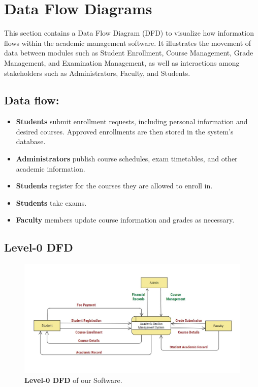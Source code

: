 \documentclass[12pt,a4paper]{article}
\begin{document}
\section{Data Flow Diagrams}
This section contains a Data Flow Diagram (DFD) to visualize how information flows within the academic management software. It illustrates the movement of data between modules such as Student Enrollment, Course Management, Grade Management, and Examination Management, as well as interactions among stakeholders such as Administrators, Faculty, and Students.

\subsection*{Data flow:}
\begin{itemize}
    \item \textbf{Students} submit enrollment requests, including personal information and desired courses. Approved enrollments are then stored in the system's database.
    \item \textbf{Administrators} publish course schedules, exam timetables, and other academic information.
    \item \textbf{Students} register for the courses they are allowed to enroll in.
    \item \textbf{Students} take exams.
    \item \textbf{Faculty} members update course information and grades as necessary.
\end{itemize}

\subsection{Level-0 DFD}
\begin{figure}[H]
    \centering
        \includegraphics[scale=0.5]{Level_0_DFD.jpg} 
    \caption{\textbf{Level-0 DFD} of our Software.}
\end{figure}
\end{document}
